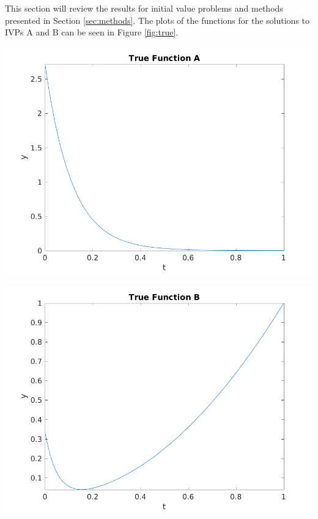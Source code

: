 \documentclass{article}
\begin{document}
This section will review the results for initial value problems and methods presented in Section \ref{sec:methods}. The plots of the functions for the solutions to IVPs A and B can be seen in Figure \ref{fig:true}.

\begin{center}
	\centering
    \begin{minipage}{0.5\textwidth}
        \centering
	    \includegraphics[width=1.1\textwidth]{../output/a_actual.png}
    \end{minipage}\hfill
    \begin{minipage}{0.5\textwidth}
        \centering
	    \includegraphics[width=1.1\textwidth]{../output/b_actual.png}
    \end{minipage}
 	\label{fig:true}
\end{center}
\end{document}

